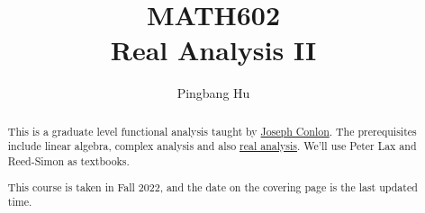 \documentclass[a4paper]{report}
\author{Pingbang Hu}
\title{MATH602\\Real Analysis II}
\begin{document}
\maketitle

\begin{abstract}
	This is a graduate level functional analysis taught by \href{https://lsa.umich.edu/math/people/faculty/conlon.html}{Joseph Conlon}. The prerequisites include linear algebra, complex analysis and also \href{https://www.pbb.wtf/posts/Notes#real-analysis-math597-umich}{real analysis}. We'll use Peter Lax\cite{lax2002functional} and Reed-Simon\cite{reed1980functional} as textbooks.

	This course is taken in Fall 2022, and the date on the covering page is the last updated time.
\end{abstract}

\tableofcontents


\newpage
\appendix
\appendixpage



\newpage
\printbibliography
\end{document}
